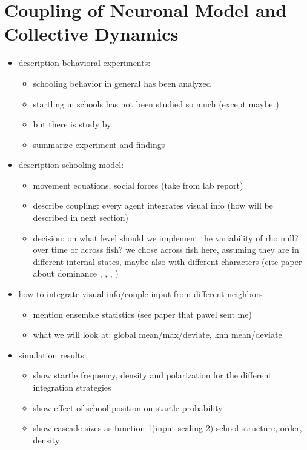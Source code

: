 \documentclass[a4paper,10pt,hidelinks]{scrreprt}
\begin{document}
	\chapter{Coupling of Neuronal Model and Collective Dynamics}
	\begin{itemize}
		\item description behavioral experiments:
		\begin{itemize}
			\item schooling behavior in general has been analyzed
			\item startling in schools has not been studied so much (except maybe 
			\cite{Fischer2015})
			\item but there is study by \cite{Rosenthal2015}
			\item summarize experiment and findings
		\end{itemize}
		\item description schooling model:
		\begin{itemize}
			\item movement equations, social forces (take from lab report)
			\item describe coupling: every agent integrates visual info (how will be described in 
			next section)
			\item decision: on what level should we implement the variability of rho null? over 
			time or across fish? we chose across fish here, assuming they are in different internal 
			states, maybe also with different characters (cite paper about dominance 
			\cite{Khan2017}, \cite{Miller2017}, \cite{Neumeister2010}, \cite{Park2018})
		\end{itemize}
		\item how to integrate visual info/couple input from different neighbors
		\begin{itemize}
			\item mention ensemble statistics (see paper that pawel sent me)
			\item what we will look at: global mean/max/deviate, knn mean/deviate
		\end{itemize}
		\item simulation results:
		\begin{itemize}
			\item show startle frequency, density and polarization for the different integration 
			strategies
			\item show effect of school position on startle probability
			\item show cascade sizes as function 1)input scaling 2) school structure, order, density
			
		\end{itemize}
	\end{itemize}
\end{document}
